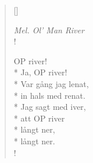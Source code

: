 \settowidth{\versewidth}{Ja, OP river!}


\begin{verse}[\versewidth]

\flagverse{}
\emph{Mel. Ol' Man River}\\!

OP river!\\*
Ja, OP river!\\*
Var gång jag lenat,\\*
in hals med renat.\\*
Jag sagt med iver,\\*
att OP river\\*
långt ner,\\*
långt ner.\\!




\end{verse}

